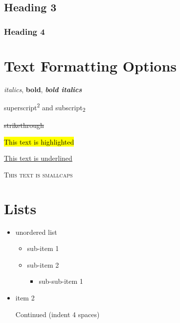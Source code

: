 \documentclass[
  11pt,
  letterpaper,
]{book}
\providecommand{\tightlist}{%
  \setlength{\itemsep}{0pt}\setlength{\parskip}{0pt}}
\begin{document}

\subsection*{Heading 3}\label{heading-3}

\subsubsection*{Heading 4}\label{heading-4}

\section*{Text Formatting Options}\label{text-formatting-options}


\emph{italics}, \textbf{bold}, \textbf{\emph{bold italics}}

superscript\textsuperscript{2} and subscript\textsubscript{2}

\st{strikethrough}

\hl{This text is highlighted}

\ul{This text is underlined}

\textsc{This text is smallcaps}

\section*{Lists}\label{lists}


\begin{itemize}
\item
  unordered list

  \begin{itemize}
  \tightlist
  \item
    sub-item 1
  \item
    sub-item 2

    \begin{itemize}
    \tightlist
    \item
      sub-sub-item 1
    \end{itemize}
  \end{itemize}
\item
  item 2

  Continued (indent 4 spaces)
\end{itemize}
\end{document}
